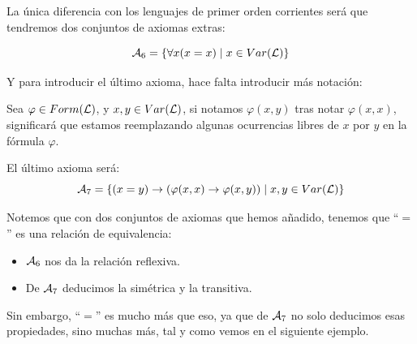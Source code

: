 La única diferencia con los lenguajes de primer orden corrientes será que tendremos dos conjuntos de axiomas extras:

\begin{equation*}
    \mathcal{A}_6 = \{\forall x(x=x) \mid x\in Var(\mathcal{L})\}
\end{equation*}

Y para introducir el último axioma, hace falta introducir más notación:
\begin{notacion}
    Sea $\varphi \in Form(\mathcal{L})$, y $x,y\in Var(\mathcal{L})$, si notamos $\varphi(x,y)$ tras notar $\varphi(x,x)$, significará que estamos reemplazando algunas ocurrencias libres de $x$ por $y$ en la fórmula $\varphi$.
\end{notacion}
El último axioma será:
\begin{equation*}
    \mathcal{A}_7 = \{(x=y)\to (\varphi(x,x)\to \varphi(x,y))\mid x,y\in Var(\mathcal{L})\}
\end{equation*}

\begin{observacion}
    Notemos que con dos conjuntos de axiomas que hemos añadido, tenemos que ``$=$'' es una relación de equivalencia:
    \begin{itemize}
        \item $\mathcal{A}_6$ nos da la relación reflexiva.
        \item De $\mathcal{A}_7$ deducimos la simétrica y la transitiva.
    \end{itemize}
    Sin embargo, ``$=$'' es mucho más que eso, ya que de $\mathcal{A}_7$ no solo deducimos esas propiedades, sino muchas más, tal y como vemos en el siguiente ejemplo.
\end{observacion}

